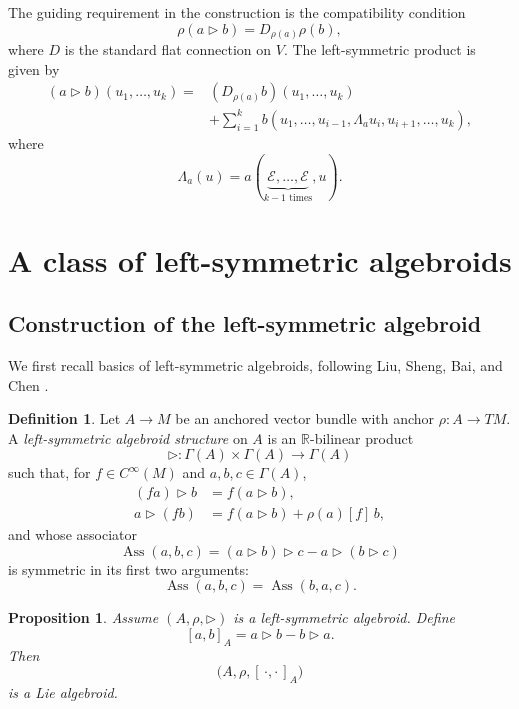 \documentclass[12pt,reqno]{amsart}
\newtheorem{propn}[thm]{Proposition}
\theoremstyle{definition}
\newtheorem{defn}[thm]{Definition}
\theoremstyle{remark}
\newcommand{\R}{\mathbb{R}}
\newcommand{\E}{\mathcal{E}}
\begin{document}
The guiding requirement in the construction is the compatibility
condition
\[
\rho(a\triangleright b)
=
D_{\rho(a)}\rho(b),
\]
where \(D\) is the standard flat connection on \(V\). The
left-symmetric product is given by
\[
\begin{aligned}
(a\triangleright b)(u_1,\ldots,u_k)
={}&
(D_{\rho(a)}b)(u_1,\ldots,u_k)
\\
&+
\sum_{i=1}^k
b(u_1,\ldots,u_{i-1},
\Lambda_a u_i,
u_{i+1},\ldots,u_k),
\end{aligned}
\]
where
\[
\Lambda_a(u)
=
a(\underbrace{\E,\ldots,\E}_{k-1\text{ times}},u).
\]



\section{A class of left-symmetric algebroids}



 
\subsection{Construction of the left-symmetric algebroid}
We first recall basics of left-symmetric algebroids, following Liu, Sheng, Bai, and Chen \cite{LSBC}.
\begin{defn}
Let \(A\to M\) be an anchored vector bundle with anchor
\(\rho\colon A\to TM\). A \emph{left-symmetric algebroid structure}
on \(A\) is an \(\R\)-bilinear product
\[
\triangleright\colon
\Gamma(A)\times\Gamma(A)
\longrightarrow\Gamma(A)
\]
such that, for $f \in C^{\infty}(M)$ and $a,b,c \in \Gamma(A)$,
\begin{align}
(fa)\triangleright b
&=
f(a\triangleright b),
\label{eq:LSA-first-Leibniz}
\\
a\triangleright(fb)
&=
f(a\triangleright b)+\rho(a)[f]\,b,
\label{eq:LSA-second-Leibniz}
\end{align}
and whose associator
\begin{equation}
\operatorname{Ass}(a,b,c)
=
(a\triangleright b)\triangleright c
-
a\triangleright(b\triangleright c)
\label{eq:associator-definition}
\end{equation}
is symmetric in its first two arguments:
\begin{equation}
\operatorname{Ass}(a,b,c)
=
\operatorname{Ass}(b,a,c).
\label{eq:left-symmetric-identity}
\end{equation}
\end{defn}

\begin{propn}
Assume $(A,\rho,\triangleright)$ is a left-symmetric algebroid. Define
\[
[a,b]_A
=
a\triangleright b-b\triangleright a.
\]
Then
\[
\bigl(A,\rho,[\,\cdot,\cdot\,]_A\bigr)
\]
is a Lie algebroid.
\end{propn}
\end{document}
